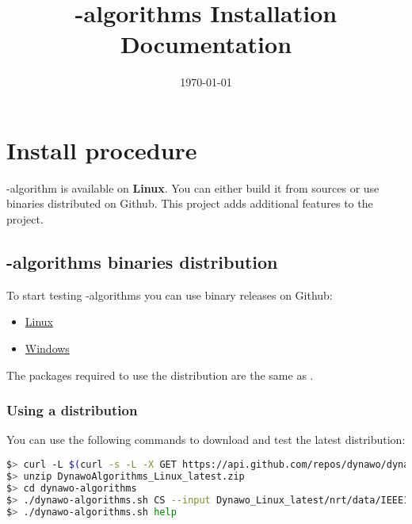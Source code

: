 \documentclass[a4paper, 12pt]{report}
\begin{document}
\title{\Dynawo-algorithms Installation Documentation}
\date\today

\maketitle
\tableofcontents

\chapter{Install procedure}

\Dynawo-algorithm is available on \textbf{Linux}. 
You can either build it from sources or use binaries distributed on Github.
This project adds additional features to the \href{https://github.com/dynawo/dynawo}{\Dynawo} project.

\section{\Dynawo-algorithms binaries distribution}

To start testing \Dynawo-algorithms you can use binary releases on Github:
\begin{itemize}
\item
  \href{https://github.com/dynawo/dynawo-algorithms/releases/download/v1.6.0/DynawoAlgorithms_Linux_v1.6.0.zip}{Linux}
\item
  \href{https://github.com/dynawo/dynawo-algorithms/releases/download/v1.6.0/DynawoAlgorithms_Windows_v1.6.0.zip}{Windows}
\end{itemize}


The packages required to use the distribution are the same as \Dynawo.

\subsection{Using a distribution}

You can use the following commands to download and test the latest distribution:
\begin{lstlisting}[language=bash, breaklines=true, breakatwhitespace=false]
$> curl -L $(curl -s -L -X GET https://api.github.com/repos/dynawo/dynawo-algorithms/releases/latest | grep "DynawoAlgorithms_Linux" | grep url | cut -d '"' -f 4) -o DynawoAlgorithms_Linux_latest.zip
$> unzip DynawoAlgorithms_Linux_latest.zip
$> cd dynawo-algorithms
$> ./dynawo-algorithms.sh CS --input Dynawo_Linux_latest/nrt/data/IEEE14/IEEE14_BlackBoxModels/IEEE14.jobs
$> ./dynawo-algorithms.sh help
\end{lstlisting}
\end{document}
